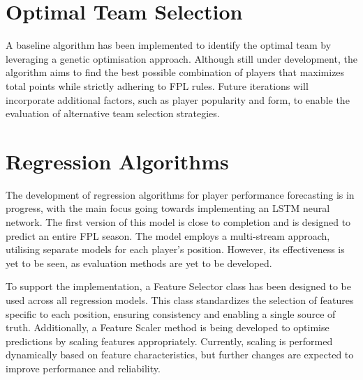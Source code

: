 \section{Optimal Team Selection}

A baseline algorithm has been implemented to identify the optimal team by leveraging a genetic optimisation approach. Although still under development, the algorithm aims to find the best possible combination of players that maximizes total points while strictly adhering to FPL rules. Future iterations will incorporate additional factors, such as player popularity and form, to enable the evaluation of alternative team selection strategies.

\section{Regression Algorithms}

The development of regression algorithms for player performance forecasting is in progress, with the main focus going towards implementing an LSTM neural network. The first version of this model is close to completion and is designed to predict an entire FPL season. The model employs a multi-stream approach, utilising separate models for each player's position. However, its effectiveness is yet to be seen, as evaluation methods are yet to be developed.

To support the implementation, a Feature Selector class has been designed to be used across all regression models. This class standardizes the selection of features specific to each position, ensuring consistency and enabling a single source of truth. Additionally, a Feature Scaler method is being developed to optimise predictions by scaling features appropriately. Currently, scaling is performed dynamically based on feature characteristics, but further changes are expected to improve performance and reliability.